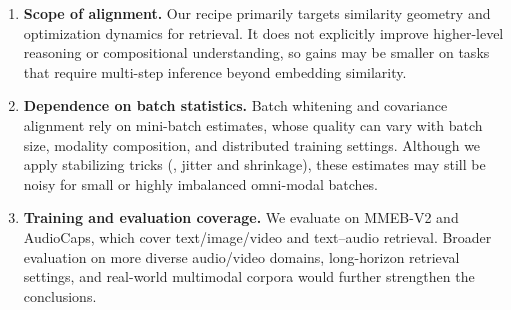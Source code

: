 \begin{enumerate}
    \item \textbf{Scope of alignment.}
    Our recipe primarily targets similarity geometry and optimization dynamics for retrieval.
    It does not explicitly improve higher-level reasoning or compositional understanding, so gains may be smaller on tasks that require multi-step inference beyond embedding similarity.

    \item \textbf{Dependence on batch statistics.}
    Batch whitening and covariance alignment rely on mini-batch estimates, whose quality can vary with batch size, modality composition, and distributed training settings.
    Although we apply stabilizing tricks (\eg, jitter and shrinkage), these estimates may still be noisy for small or highly imbalanced omni-modal batches.

    \item \textbf{Training and evaluation coverage.}
    We evaluate on MMEB-V2 and AudioCaps, which cover text/image/video and text--audio retrieval.
    Broader evaluation on more diverse audio/video domains, long-horizon retrieval settings, and real-world multimodal corpora would further strengthen the conclusions.
\end{enumerate}



